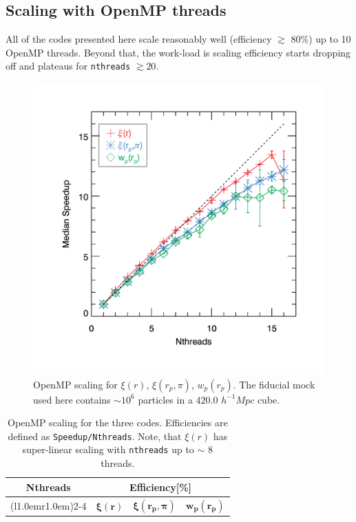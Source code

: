 \documentclass[12pt,titlepage]{article}
\newcommand{\xir}{\ensuremath{{\xi(r)}}\xspace}
\newcommand{\wprp}{\ensuremath{{w_p(r_p)}}\xspace}
\newcommand{\xirppi}{\ensuremath{{\xi(r_p,\pi)}}\xspace}
\newcommand{\hMpc}{\ensuremath{{h^{-1}Mpc}}\xspace}
\begin{document}
\subsection{Scaling with OpenMP threads}
All of the codes presented here scale reasonably well (efficiency $\gtrsim$ 80\%) up to 10 OpenMP threads. Beyond that, the work-load is 
scaling efficiency starts dropping off and plateaus for \texttt{nthreads} $\gtrsim 20$. 
\begin{figure}[htbp]
\includegraphics[clip=true,width=\linewidth]{timings_Mr19_openmp}%
\caption{OpenMP scaling for \xir, \xirppi, \wprp. The fiducial mock used here contains $\sim 10^6$ particles 
in a $420.0$ \hMpc cube. }
\label{fig:scaling_openmp}
\end{figure}

\begin{table}
\centering
\caption{\footnotesize OpenMP scaling for the three codes. Efficiencies are defined 
as \texttt{Speedup/Nthreads}. Note, that \xir has super-linear scaling with \texttt{nthreads}
up to $\sim$ 8 threads.}
\begin{adjustbox}{max width=\textwidth}
\begin{tabular}{cccc} 
\toprule
\multirow{2}{*}{\textbf{Nthreads}}   &
\multicolumn{3}{c}{\textbf{Efficiency[\%]}} \\
\cmidrule(l{1.0em}r{1.0em}){2-4}
&
\multicolumn{1}{c}{$\boldsymbol{\xir}$}   &
\multicolumn{1}{c}{$\boldsymbol{\xirppi}$} &
\multicolumn{1}{c}{$\boldsymbol{\wprp}$}     \\
\midrule
 
\bottomrule
\end{tabular}
\end{adjustbox}
\label{table:openmp}
\end{table}
\end{document}
